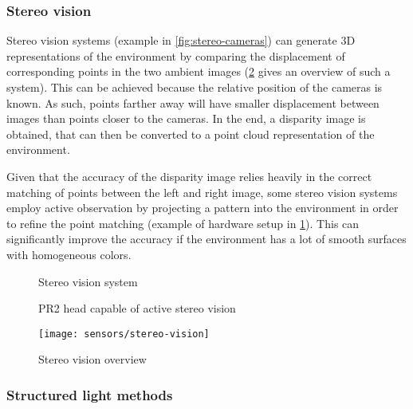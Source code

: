 \subsubsection{Stereo vision}

Stereo vision systems (example in \cref{fig:stereo-cameras}) can generate 3D representations of the environment by comparing the displacement of corresponding points in the two ambient images (\cref{fig:stereo-vision} gives an overview of such a system). This can be achieved because the relative position of the cameras is known. As such, points farther away will have smaller displacement between images than points closer to the cameras. In the end, a disparity image is obtained, that can then be converted to a point cloud representation of the environment.

Given that the accuracy of the disparity image relies heavily in the correct matching of points between the left and right image, some stereo vision systems employ active observation by projecting a pattern into the environment in order to refine the point matching (example of hardware setup in \cref{fig:pr2-active-stereo}). This can significantly improve the accuracy if the environment has a lot of smooth surfaces with homogeneous colors.

\begin{figure}[H]
	\begin{floatrow}[2]
		{\caption[Stereo vision system]{Stereo vision system \cite{Kaczurba2013}}\label{fig:stereo-cameras}}
		{\caption[PR2 head capable of active stereo vision]{PR2 head capable of active stereo vision\protect\footnotemark}\label{fig:pr2-active-stereo}}
	\end{floatrow}
\end{figure}


\begin{figure}[H]
	\centering
	\texttt{[image: sensors/stereo-vision]}
	\caption[Stereo vision overview]{Stereo vision overview \cite{Yang2014}}
	\label{fig:stereo-vision}
\end{figure}


\subsubsection{Structured light methods}

